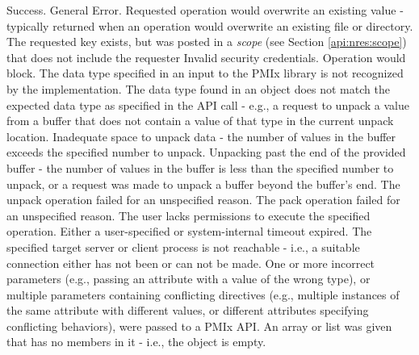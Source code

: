 \begin{constantdesc}
%
Success.
%
General Error.
%
Requested operation would overwrite an existing value - typically returned
when an operation would overwrite an existing file or directory.
%
The requested key exists, but was posted in a \emph{scope} (see Section \ref{api:nres:scope}) that does not include the requester
%
Invalid security credentials.
%
Operation would block.
%
The data type specified in an input to the \ac{PMIx} library is not recognized
by the implementation.
%
The data type found in an object does not match the expected data type
as specified in the \ac{API} call - e.g., a request to unpack a
 value from a buffer that does not contain a value of
that type in the current unpack location.
%
Inadequate space to unpack data - the number of values in the buffer exceeds
the specified number to unpack.
%
Unpacking past the end of the provided buffer - the number of values in the
buffer is less than the specified number to unpack, or a request was made to
unpack a buffer beyond the buffer's end.
%
The unpack operation failed for an unspecified reason.
%
The pack operation failed for an unspecified reason.
%
The user lacks permissions to execute the specified operation.
%
Either a user-specified or system-internal timeout expired.
%
The specified target server or client process is not reachable - i.e., a
suitable connection either has not been or can not be made.
%
One or more incorrect parameters (e.g., passing an attribute with a value of the wrong type), or multiple parameters containing conflicting directives (e.g., multiple instances of the same attribute with different values, or different attributes specifying conflicting behaviors), were passed to a \ac{PMIx} \ac{API}.
%
An array or list was given that has no members in it - i.e., the object is empty.
%

\end{constantdesc}
